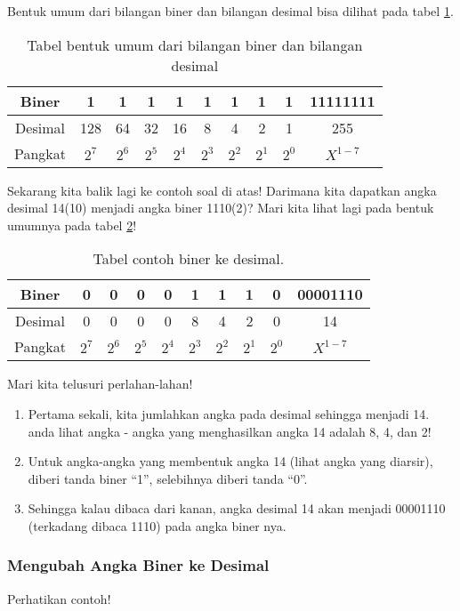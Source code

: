 \documentclass{article}
\begin{document}
Bentuk umum dari bilangan biner dan bilangan desimal bisa dilihat pada tabel \ref{table:binerdesimal}. 

\begin{table}[h!]
\centering
\begin{tabular}{ |c|c|c|c|c|c|c|c|c|c| } 
\hline
Biner & 1 & 1 & 1 & 1 & 1 & 1 & 1 & 1 & 11111111 \\ 
\hline
Desimal & 128 & 64 & 32 & 16 & 8 & 4 & 2 & 1 & 255 \\ 
\hline
Pangkat & $2^7$ & $2^6$ & $2^5$ & $2^4$ & $2^3$ & $2^2$ & $2^1$ & $2^0$ & $X^{1-7}$ \\ 
\hline
\end{tabular}
\caption{Tabel bentuk umum dari bilangan biner dan bilangan desimal}
\label{table:binerdesimal}
\end{table}

Sekarang kita balik lagi ke contoh soal di atas! Darimana kita dapatkan angka desimal 14(10) menjadi angka biner 1110(2)? 
Mari kita lihat lagi pada bentuk umumnya pada tabel \ref{table:contoh1}!

\begin{table}[h!]
\centering
\begin{tabular}{ |c|c|c|c|c|c|c|c|c|c| } 
\hline
Biner & 0 & 0 & 0 & 0 & 1 & 1 & 1 & 0 & 00001110 \\ 
\hline
Desimal & 0 & 0 & 0 & 0 & 8 & 4 & 2 & 0 & 14 \\ 
\hline
Pangkat & $2^7$ & $2^6$ & $2^5$ & $2^4$ & $2^3$ & $2^2$ & $2^1$ & $2^0$ & $X^{1-7}$ \\ 
\hline
\end{tabular}
\caption{Tabel contoh biner ke desimal.}
\label{table:contoh1}
\end{table}

Mari kita telusuri perlahan-lahan!

\begin{enumerate}
\item Pertama sekali, kita jumlahkan angka pada desimal sehingga menjadi 14. anda lihat angka - angka yang menghasilkan angka 14 adalah 8, 4, dan 2!
\item Untuk angka-angka yang membentuk angka 14 (lihat angka yang diarsir), diberi tanda biner “1”, selebihnya diberi tanda “0”.
\item Sehingga kalau dibaca dari kanan, angka desimal 14 akan menjadi 00001110 (terkadang dibaca 1110) pada angka biner nya.
\end{enumerate}


\subsubsection{Mengubah Angka Biner ke Desimal}
Perhatikan contoh! 
\end{document}

